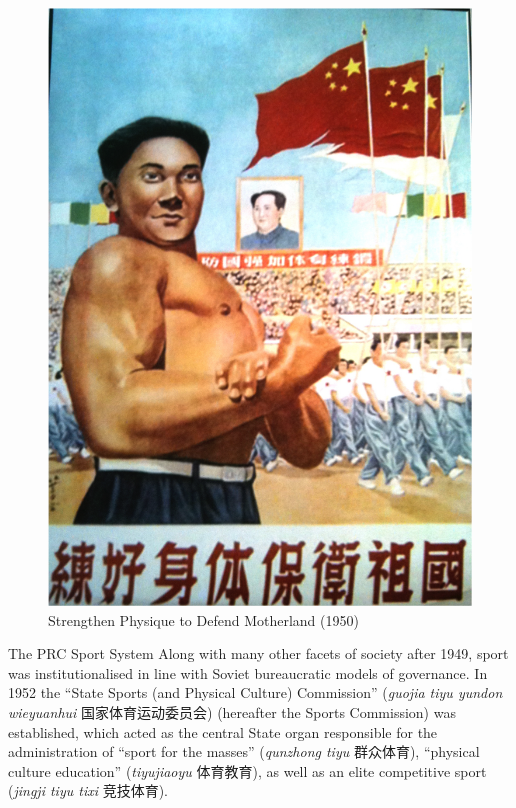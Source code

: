 \begin{figure}[htbp]
  \includegraphics[width = \linewidth]{images/motherlandStrength.png}
  \caption{Strengthen Physique to Defend Motherland (1950)}
  \label{fig:motherlandStrength}
\end{figure}


The PRC Sport System
Along with many other facets of society after 1949, sport was institutionalised in line with Soviet bureaucratic models of governance.  In 1952 the ``State Sports (and Physical Culture) Commission'' (\textit{guojia tiyu yundon wieyuanhui} 国家体育运动委员会) (hereafter the Sports Commission) was established, which acted as the central State organ responsible for the administration of ``sport for the masses'' (\textit{qunzhong tiyu} 群众体育), ``physical culture education'' (\textit{tiyujiaoyu} 体育教育), as well as an elite competitive sport (\textit{jingji tiyu tixi} 竞技体育).


